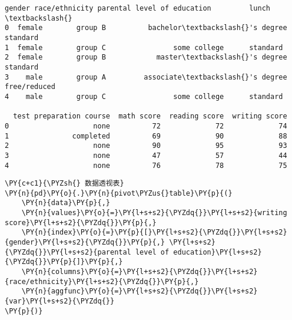             \begin{tcolorbox}[breakable, size=fbox, boxrule=.5pt, pad at break*=1mm, opacityfill=0]
\begin{Verbatim}[commandchars=\\\{\}]
   gender race/ethnicity parental level of education         lunch  \textbackslash{}
0  female        group B          bachelor\textbackslash{}'s degree      standard
1  female        group C                some college      standard
2  female        group B            master\textbackslash{}'s degree      standard
3    male        group A         associate\textbackslash{}'s degree  free/reduced
4    male        group C                some college      standard

  test preparation course  math score  reading score  writing score
0                    none          72             72             74
1               completed          69             90             88
2                    none          90             95             93
3                    none          47             57             44
4                    none          76             78             75
\end{Verbatim}
\end{tcolorbox}
        
    \begin{tcolorbox}[breakable, size=fbox, boxrule=1pt, pad at break*=1mm,colback=cellbackground, colframe=cellborder]
\begin{Verbatim}[commandchars=\\\{\}]
\PY{c+c1}{\PYZsh{} 数据透视表}
\PY{n}{pd}\PY{o}{.}\PY{n}{pivot\PYZus{}table}\PY{p}{(}
    \PY{n}{data}\PY{p}{,}
    \PY{n}{values}\PY{o}{=}\PY{l+s+s2}{\PYZdq{}}\PY{l+s+s2}{writing score}\PY{l+s+s2}{\PYZdq{}}\PY{p}{,}
    \PY{n}{index}\PY{o}{=}\PY{p}{[}\PY{l+s+s2}{\PYZdq{}}\PY{l+s+s2}{gender}\PY{l+s+s2}{\PYZdq{}}\PY{p}{,} \PY{l+s+s2}{\PYZdq{}}\PY{l+s+s2}{parental level of education}\PY{l+s+s2}{\PYZdq{}}\PY{p}{]}\PY{p}{,}
    \PY{n}{columns}\PY{o}{=}\PY{l+s+s2}{\PYZdq{}}\PY{l+s+s2}{race/ethnicity}\PY{l+s+s2}{\PYZdq{}}\PY{p}{,}
    \PY{n}{aggfunc}\PY{o}{=}\PY{l+s+s2}{\PYZdq{}}\PY{l+s+s2}{var}\PY{l+s+s2}{\PYZdq{}}
\PY{p}{)}
\end{Verbatim}
\end{tcolorbox}

